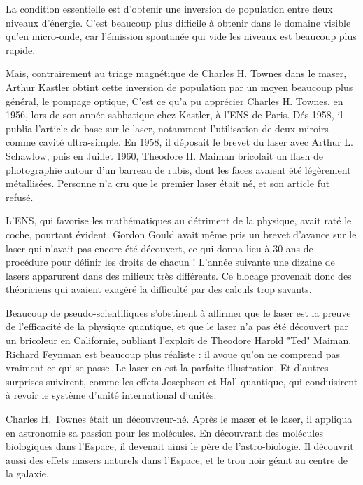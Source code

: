 \documentclass[a4paper,12pt]{article}
\begin{document}
La condition essentielle est d'obtenir une inversion de population entre deux niveaux d'énergie. C'est beaucoup plus difficile à obtenir dans le domaine visible qu'en micro-onde, car l'émission spontanée qui vide les niveaux est beaucoup plus rapide. 

Mais, contrairement au triage magnétique de Charles H. Townes dans le maser, Arthur Kastler obtint cette inversion de population par un moyen beaucoup plus général, le pompage optique,  C'est ce qu'a pu apprécier Charles H. Townes, en 1956, lors de son année sabbatique  chez Kastler, à l'ENS de Paris. Dés 1958, il publia l'article de base sur le laser, notamment l'utilisation de deux miroirs comme cavité ultra-simple. En 1958, il déposait le brevet du laser avec Arthur L. Schawlow, puis en Juillet 1960, Theodore H. Maiman bricolait un flash de photographie autour d'un barreau de rubis, dont les faces avaient été légèrement métallisées. Personne n'a cru que le premier laser était né, et son article fut refusé. 

L'ENS, qui favorise les mathématiques au détriment de la physique, avait raté le coche, pourtant évident. Gordon Gould avait même pris un brevet d'avance sur le laser qui n'avait pas encore été découvert, ce qui donna lieu à 30 ans de procédure pour définir les droits de chacun ! L'année suivante une dizaine de lasers apparurent dans des milieux très différents. Ce blocage provenait donc des théoriciens qui avaient exagéré la difficulté par des calculs trop savants.

Beaucoup de pseudo-scientifiques s'obstinent à affirmer que le laser est la preuve de l'efficacité de la physique quantique, et que le laser n'a pas été découvert par un bricoleur en Californie, oubliant l'exploit de Theodore Harold "Ted" Maiman. Richard Feynman est beaucoup plus réaliste : il avoue qu'on ne comprend pas vraiment ce qui se passe. Le laser en est la parfaite illustration. Et d'autres surprises suivirent, comme les effets Josephson et Hall quantique, qui conduisirent à revoir le système d'unité international d'unités.

Charles H. Townes était un découvreur-né. Après le maser et le laser, il appliqua en astronomie sa passion pour les molécules. En découvrant des molécules biologiques dans l'Espace, il devenait ainsi le père de l'astro-biologie. Il découvrit aussi des effets masers naturels dans l'Espace, et le trou noir géant au centre de la galaxie.    
\end{document}
